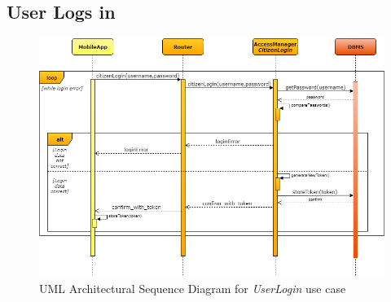 \documentclass[a4paper]{report}
\begin{document}
\subsection{User Logs in}
\begin{landscape}

\begin{figure}[hp]
\includegraphics[angle=0, scale=0.70]{ArchSequenceUserLogin}
\caption{UML Architectural Sequence Diagram for \textit{UserLogin} use case}
\label{fig:seq-userLogin}
\end{figure}

\end{landscape}
\end{document}
